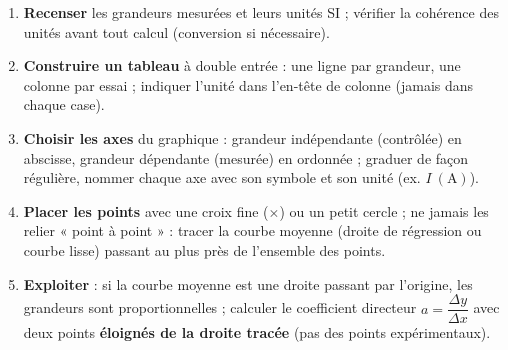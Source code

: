 \documentclass[11pt]{article}
\newcommand{\cle}[1]{{\popxbold\color{popdark}#1}}
\begin{document}
\begin{methode}
\begin{enumerate}
\item \textbf{Recenser} les grandeurs mesurées et leurs unités SI ; vérifier la cohérence des unités avant tout calcul (conversion si nécessaire).
\item \textbf{Construire un tableau} à double entrée : une ligne par grandeur, une colonne par essai ; indiquer l'unité dans l'en-tête de colonne (jamais dans chaque case).
\item \textbf{Choisir les axes} du graphique : grandeur indépendante (contrôlée) en abscisse, grandeur dépendante (mesurée) en ordonnée ; graduer de façon régulière, nommer chaque axe avec son symbole et son unité (ex. $I\ (\text{A})$).
\item \textbf{Placer les points} avec une croix fine ($\times$) ou un petit cercle ; ne jamais les relier « point à point » : tracer la \cle{courbe moyenne} (droite de régression ou courbe lisse) passant au plus près de l'ensemble des points.
\item \textbf{Exploiter} : si la courbe moyenne est une droite passant par l'origine, les grandeurs sont proportionnelles ; calculer le coefficient directeur $a = \dfrac{\Delta y}{\Delta x}$ avec deux points \textbf{éloignés de la droite tracée} (pas des points expérimentaux).
\end{enumerate}
\end{methode}
\end{document}
